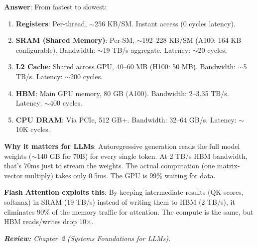 \begin{questionbox}
\textbf{Answer}: From fastest to slowest:

\begin{enumerate}
  \item \textbf{Registers}: Per-thread, $\sim$256 KB/SM. Instant access (0 cycles latency).
  \item \textbf{SRAM (Shared Memory)}: Per-SM, $\sim$192--228 KB/SM (A100: 164 KB configurable). Bandwidth: $\sim$19 TB/s aggregate. Latency: $\sim$20 cycles.
  \item \textbf{L2 Cache}: Shared across GPU, 40--60 MB (H100: 50 MB). Bandwidth: $\sim$5 TB/s. Latency: $\sim$200 cycles.
  \item \textbf{HBM}: Main GPU memory, 80 GB (A100). Bandwidth: 2--3.35 TB/s. Latency: $\sim$400 cycles.
  \item \textbf{CPU DRAM}: Via PCIe, 512 GB+. Bandwidth: 32--64 GB/s. Latency: $\sim$10K cycles.
\end{enumerate}

\textbf{Why it matters for LLMs}: Autoregressive generation reads the full model weights ($\sim$140 GB for 70B) for every single token. At 2 TB/s HBM bandwidth, that’s 70ms just to stream the weights. The actual computation (one matrix-vector multiply) takes only 0.5ms. The GPU is 99\% waiting for data.

\textbf{Flash Attention exploits this}: By keeping intermediate results (QK scores, softmax) in SRAM (19 TB/s) instead of writing them to HBM (2 TB/s), it eliminates 90\% of the memory traffic for attention. The compute is the same, but HBM reads/writes drop 10$\times$.

\emph{\textbf{Review:} Chapter~2 (Systems Foundations for LLMs).}
\end{questionbox}

